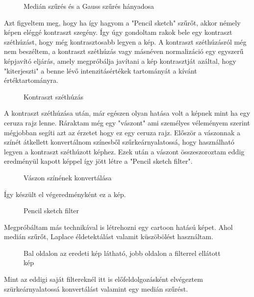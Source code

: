 \begin{figure}[ht] 
\centering
{}
\caption{Medián szűrés és a Gauss szűrés hányadosa } 
\label{fig: pencil4}
\end{figure}
Azt figyeltem meg, hogy ha így hagyom a "Pencil sketch" szűrőt, akkor némely képen eléggé kontraszt szegény. Így úgy gondoltam rakok bele egy kontraszt széthúzást, hogy még kontrasztosabb legyen a kép. A  kontraszt széthúzásról még nem beszéltem, a kontraszt széthúzás vagy másnéven normalizáció egy egyszerű képjavító eljárás, amely megpróbálja javítani a kép kontrasztját azáltal, hogy "kiterjeszti" a benne lévő intenzitásértékek tartományát a kívánt értéktartományra. 
\begin{figure}[ht]
\centering
{}
\caption{Kontraszt széthúzás } 
\label{fig: pencil5}
\end{figure}
A kontraszt széthúzása után, már egészen olyan hatása volt a képnek mint ha egy ceruza rajz lenne. Ráraktam még egy "vászont" ami személyes véleményem szerint mégjobban segíti azt az érzetet hogy ez egy ceruza rajz. Először a vászonnak a színét átkellett konvertálnom színesből szűrkeárnyalatossá, hogy használható legyen a kontraszt széthúzott képhez. Ezek után a vászont összeszoroztam eddig eredményül kapott képpel így jött létre a "Pencil sketch filter".
\begin{figure}[ht] 
\centering
{}
\caption{Vászon színének konvertálása } 
\label{fig: pencil6}
\end{figure}
Így készült el végeredményként ez a kép.
\begin{figure}[ht]
\centering
{}
\caption{Pencil sketch filter } 
\label{fig: pencil7}
\end{figure}
\newpage
{}
Megpróbáltam más technikával is létrehozni egy cartoon hatású képet. Ahol medián szűrőt, Laplace éldetektálást valamit küszöbölést használtam.
\begin{figure}[ht]
\centering
{}
\caption{Bal oldalon az eredeti kép látható, jobb oldalon a filterrel ellátott kép } 
\label{fig: 2_cartoon1}
\end{figure}
Mint az eddigi saját filtereknél itt is előfeldolgozásként elvégeztem szürkeárnyalatossá konvertálást valamint egy  medián szűrést. 
